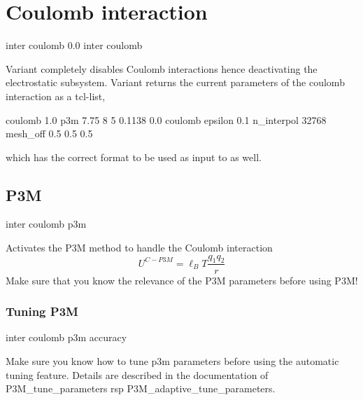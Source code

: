 \section{Coulomb interaction}
\label{sec:inter-electrostatics}

\begin{essyntax}
   inter coulomb 0.0
   inter coulomb
\end{essyntax}

Variant  completely disables Coulomb interactions hence
deactivating the electrostatic subsystem.  Variant  returns
the current parameters of the coulomb interaction as a tcl-list, \eg
\begin{tclcode}
{coulomb 1.0 p3m 7.75 8 5 0.1138 0.0} {coulomb epsilon 0.1
n_interpol 32768 mesh_off 0.5 0.5 0.5}
\end{tclcode}
which has the correct format to be used as input to  as
well.

\subsection{P3M}

\begin{essyntax}
  inter coulomb p3m    
\end{essyntax}

Activates the P3M method to handle the Coulomb
interaction
\begin{equation}
  U^{C-P3M} = \ell_B T \frac{q_1 q_2}{r}
\end{equation}
Make sure that you know the relevance of the P3M parameters before
using P3M!

\subsubsection{Tuning P3M}
\begin{essyntax}
  inter coulomb p3m 
  accuracy \\
\end{essyntax}


Make sure you know how to tune p3m parameters before using the
automatic tuning feature. Details are described in the documentation
of P3M_tune_parameters rsp P3M_adaptive_tune_parameters.

